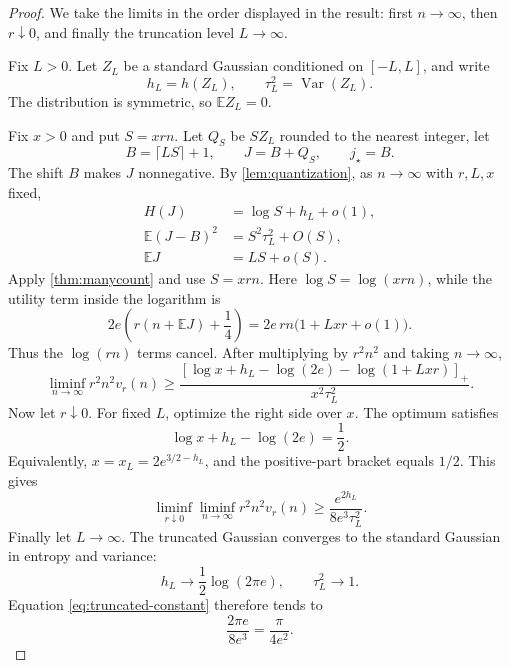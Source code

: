 \documentclass[10pt,a4paper]{amsart}
\newcommand{\E}{\mathbb{E}}
\newcommand{\Var}{\operatorname{Var}}
\newcommand{\pos}[1]{\left[#1\right]_{+}}
\begin{document}
\begin{proof}
We take the limits in the order displayed in the result: first $n\to\infty$, then $r\downarrow0$, and finally the truncation level $L\to\infty$.

Fix $L>0$. Let $Z_L$ be a standard Gaussian conditioned on $[-L,L]$, and write
\[
  h_L=h(Z_L),
  \qquad
  \tau_L^2=\Var(Z_L).
\]
The distribution is symmetric, so $\E Z_L=0$.

Fix $x>0$ and put $S=xrn$. Let $Q_S$ be $SZ_L$ rounded to the nearest integer, let
\[
  B=\lceil LS\rceil+1,
  \qquad
  J=B+Q_S,
  \qquad
  j_\star=B.
\]
The shift $B$ makes $J$ nonnegative. By \cref{lem:quantization}, as $n\to\infty$ with $r,L,x$ fixed,
\begin{align*}
  H(J)&=\log S+h_L+o(1),\\
  \E(J-B)^2&=S^2\tau_L^2+O(S),\\
  \E J&=LS+o(S).
\end{align*}
Apply \cref{thm:manycount} and use $S=xrn$. Here $\log S=\log(xrn)$, while the utility term inside the logarithm is
\[
  2e\left(r(n+\E J)+\frac14\right)
  =2e\,rn\bigl(1+Lxr+o(1)\bigr).
\]
Thus the $\log(rn)$ terms cancel. After multiplying by $r^2n^2$ and taking $n\to\infty$,
\begin{equation}
  \liminf_{n\to\infty}r^2n^2v_r(n)
  \ge
  \frac{
    \pos{
      \log x+h_L-\log(2e)-\log(1+Lxr)
    }
  }{
    x^2\tau_L^2
  }.
  \label{eq:truncated-lower}
\end{equation}
Now let $r\downarrow0$. For fixed $L$, optimize the right side over $x$. The optimum satisfies
\[
  \log x+h_L-\log(2e)=\frac12.
\]
Equivalently, $x=x_L=2e^{3/2-h_L}$, and the positive-part bracket equals $1/2$. This gives
\begin{equation}
  \liminf_{r\downarrow0}
  \liminf_{n\to\infty}r^2n^2v_r(n)
  \ge
  \frac{e^{2h_L}}{8e^3\tau_L^2}.
  \label{eq:truncated-constant}
\end{equation}
Finally let $L\to\infty$. The truncated Gaussian converges to the standard Gaussian in entropy and variance:
\[
  h_L\to\frac12\log(2\pi e),
  \qquad
  \tau_L^2\to1.
\]
Equation \eqref{eq:truncated-constant} therefore tends to
\[
  \frac{2\pi e}{8e^3}
  =\frac{\pi}{4e^2}.
\]
\end{proof}
\end{document}
